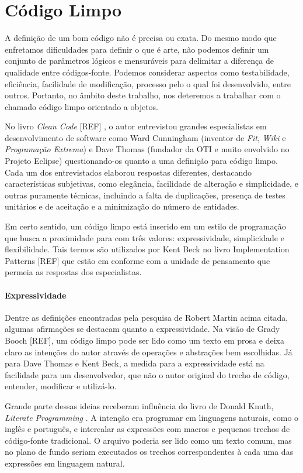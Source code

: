 \chapter{Código Limpo}
\label{chap:codigo_limpo}

A definição de um bom código não é precisa ou exata. Do mesmo modo que enfretamos dificuldades para definir o que é arte, não podemos definir um conjunto de parâmetros lógicos e mensuráveis para delimitar a diferença de qualidade entre códigos-fonte. Podemos considerar aspectos como testabilidade, eficiência, facilidade de modificação, processo pelo o qual foi desenvolvido, entre outros. Portanto, no âmbito deste trabalho, nos deteremos a trabalhar com o chamado código limpo orientado a objetos.

No livro \textit{Clean Code} [REF] \cite{}, o autor entrevistou grandes especialistas em desenvolvimento de software como Ward Cunningham (inventor de \textit{Fit}, \textit{Wiki} e \textit{Programação Extrema}) e Dave Thomas (fundador da OTI e muito envolvido no Projeto Eclipse) questionando-os quanto a uma definição para código limpo. Cada um dos entrevistados elaborou respostas diferentes, destacando características subjetivas, como elegância, facilidade de alteração e simplicidade, e outras puramente técnicas, incluindo a falta de duplicações, presença de testes unitários e de aceitação e a minimização do número de entidades.

Em certo sentido, um código limpo está inserido em um estilo de programação que busca a proximidade para com três valores: expressividade, simplicidade e flexibilidade. Tais termos são utilizados por Kent Beck no livro Implementation Patterns [REF] que estão em conforme com a unidade de pensamento que permeia as respostas dos especialistas.

\subsubsection{Expressividade}
Dentre as definições encontradas pela pesquisa de Robert Martin acima citada, algumas afirmações se destacam quanto a expressividade. Na visão de Grady Booch [REF], um código limpo pode ser lido como um texto em prosa e deixa claro as intenções do autor através de operações e abstrações bem escolhidas. Já para Dave Thomas e Kent Beck, a medida para a expressividade está na facilidade para um desenvolvedor, que não o autor original do trecho de código, entender, modificar e utilizá-lo.

Grande parte dessas ideias receberam influência do livro de Donald Knuth, \textit{Literate Programming} \cite{Knuth92}. A intenção era programar em linguagens naturais, como o inglês e português, e intercalar as expressões com macros e pequenos trechos de código-fonte tradicional. O arquivo poderia ser lido como um texto comum, mas no plano de fundo seriam executados os trechos correspondentes à cada uma das expressões em linguagem natural.

